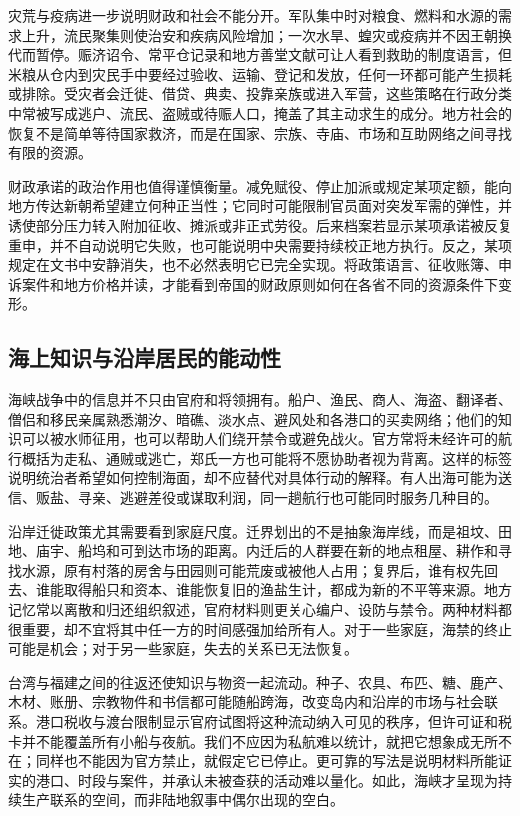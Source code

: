 灾荒与疫病进一步说明财政和社会不能分开。军队集中时对粮食、燃料和水源的需求上升，流民聚集则使治安和疾病风险增加；一次水旱、蝗灾或疫病并不因王朝换代而暂停。赈济诏令、常平仓记录和地方善堂文献可让人看到救助的制度语言，但米粮从仓内到灾民手中要经过验收、运输、登记和发放，任何一环都可能产生损耗或排除。受灾者会迁徙、借贷、典卖、投靠亲族或进入军营，这些策略在行政分类中常被写成逃户、流民、盗贼或待赈人口，掩盖了其主动求生的成分。地方社会的恢复不是简单等待国家救济，而是在国家、宗族、寺庙、市场和互助网络之间寻找有限的资源。

财政承诺的政治作用也值得谨慎衡量。减免赋役、停止加派或规定某项定额，能向地方传达新朝希望建立何种正当性；它同时可能限制官员面对突发军需的弹性，并诱使部分压力转入附加征收、摊派或非正式劳役。后来档案若显示某项承诺被反复重申，并不自动说明它失败，也可能说明中央需要持续校正地方执行。反之，某项规定在文书中安静消失，也不必然表明它已完全实现。将政策语言、征收账簿、申诉案件和地方价格并读，才能看到帝国的财政原则如何在各省不同的资源条件下变形。

\subsection*{海上知识与沿岸居民的能动性}
海峡战争中的信息并不只由官府和将领拥有。船户、渔民、商人、海盗、翻译者、僧侣和移民亲属熟悉潮汐、暗礁、淡水点、避风处和各港口的买卖网络；他们的知识可以被水师征用，也可以帮助人们绕开禁令或避免战火。官方常将未经许可的航行概括为走私、通贼或逃亡，郑氏一方也可能将不愿协助者视为背离。这样的标签说明统治者希望如何控制海面，却不应替代对具体行动的解释。有人出海可能为送信、贩盐、寻亲、逃避差役或谋取利润，同一趟航行也可能同时服务几种目的。

沿岸迁徙政策尤其需要看到家庭尺度。迁界划出的不是抽象海岸线，而是祖坟、田地、庙宇、船坞和可到达市场的距离。内迁后的人群要在新的地点租屋、耕作和寻找水源，原有村落的房舍与田园则可能荒废或被他人占用；复界后，谁有权先回去、谁能取得船只和资本、谁能恢复旧的渔盐生计，都成为新的不平等来源。地方记忆常以离散和归还组织叙述，官府材料则更关心编户、设防与禁令。两种材料都很重要，却不宜将其中任一方的时间感强加给所有人。对于一些家庭，海禁的终止可能是机会；对于另一些家庭，失去的关系已无法恢复。

台湾与福建之间的往返还使知识与物资一起流动。种子、农具、布匹、糖、鹿产、木材、账册、宗教物件和书信都可能随船跨海，改变岛内和沿岸的市场与社会联系。港口税收与渡台限制显示官府试图将这种流动纳入可见的秩序，但许可证和税卡并不能覆盖所有小船与夜航。我们不应因为私航难以统计，就把它想象成无所不在；同样也不能因为官方禁止，就假定它已停止。更可靠的写法是说明材料所能证实的港口、时段与案件，并承认未被查获的活动难以量化。如此，海峡才呈现为持续生产联系的空间，而非陆地叙事中偶尔出现的空白。

